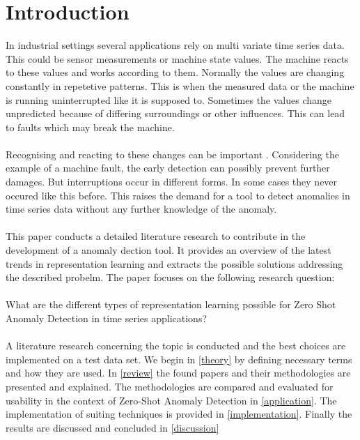 \section{Introduction}\label{intro}
In industrial settings several applications rely on multi variate time series data. This could be sensor measurements or machine state values. The machine reacts to these values and works according to them. Normally the values are changing constantly in repetetive patterns. This is when the measured data or the machine is running uninterrupted like it is supposed to. Sometimes the values change unpredicted because of differing surroundings or other influences. This can lead to faults which may break the machine.\\\\
Recognising and reacting to these changes can be important%
. Considering the example of a machine fault, the early detection can possibly prevent further damages. But interruptions occur in different forms. In some cases they never occured like this before. This raises the demand for a tool to detect anomalies in time series data without any further knowledge of the anomaly.\\\\
This paper conducts a detailed literature research to contribute in the development of a anomaly dection tool. It provides an overview of the latest trends in representation learning and extracts the possible solutions addressing the described probelm. The paper focuses on the following research question:\\\\
What are the different types of representation learning possible for Zero Shot Anomaly Detection in time series applications?\\\\
A literature research concerning the topic is conducted and the best choices are implemented on a test data set. We begin in \ref{theory} by defining necessary terms and how they are used. In \ref{review} the found papers and their methodologies are presented and explained. The methodologies are compared and evaluated for usability in the context of Zero-Shot Anomaly Detection in \ref{application}. The implementation of suiting techniques is provided in \ref{implementation}. Finally the results are discussed and concluded in \ref{discussion}
